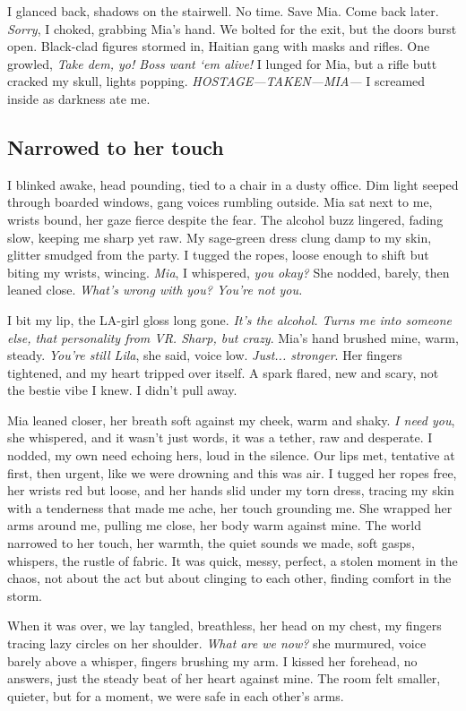 \documentclass[12pt,oneside]{book}
\begin{document}
I glanced back, shadows on the stairwell. No time. Save Mia. Come back later. \textit{Sorry}, I choked, grabbing Mia’s hand. We bolted for the exit, but the doors burst open. Black-clad figures stormed in, Haitian gang with masks and rifles.  One growled, \textit{Take dem, yo! Boss want ‘em alive!} I lunged for Mia, but a rifle butt cracked my skull, lights popping. \textit{HOSTAGE—TAKEN—MIA—} I screamed inside as darkness ate me.

\subsection*{Narrowed to her touch}

I blinked awake, head pounding, tied to a chair in a dusty office. Dim light seeped through boarded windows, gang voices rumbling outside. Mia sat next to me, wrists bound, her gaze fierce despite the fear. The alcohol buzz lingered, fading slow, keeping me sharp yet raw. My sage-green dress clung damp to my skin, glitter smudged from the party. I tugged the ropes, loose enough to shift but biting my wrists, wincing. \textit{Mia}, I whispered, \textit{you okay?} She nodded, barely, then leaned close. \textit{What’s wrong with you? You’re not you.}

I bit my lip, the LA-girl gloss long gone. \textit{It’s the alcohol. Turns me into someone else, that personality from VR. Sharp, but crazy}. Mia’s hand brushed mine, warm, steady. \textit{You’re still Lila}, she said, voice low. \textit{Just... stronger}. Her fingers tightened, and my heart tripped over itself. A spark flared, new and scary, not the bestie vibe I knew. I didn’t pull away.

Mia leaned closer, her breath soft against my cheek, warm and shaky. \textit{I need you}, she whispered, and it wasn’t just words, it was a tether, raw and desperate. I nodded, my own need echoing hers, loud in the silence. Our lips met, tentative at first, then urgent, like we were drowning and this was air. I tugged her ropes free, her wrists red but loose, and her hands slid under my torn dress, tracing my skin with a tenderness that made me ache, her touch grounding me. She wrapped her arms around me, pulling me close, her body warm against mine. The world narrowed to her touch, her warmth, the quiet sounds we made, soft gasps, whispers, the rustle of fabric. It was quick, messy, perfect, a stolen moment in the chaos, not about the act but about clinging to each other, finding comfort in the storm.

When it was over, we lay tangled, breathless, her head on my chest, my fingers tracing lazy circles on her shoulder. \textit{What are we now?} she murmured, voice barely above a whisper, fingers brushing my arm. I kissed her forehead, no answers, just the steady beat of her heart against mine. The room felt smaller, quieter, but for a moment, we were safe in each other’s arms.
\end{document}
